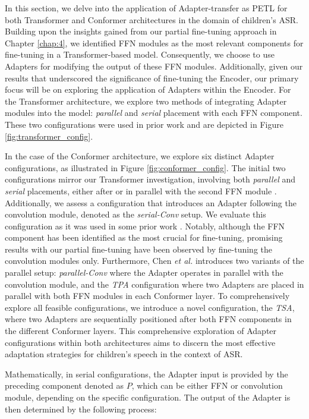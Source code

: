 In this section, we delve into the application of Adapter-transfer as \ac{PETL} for both Transformer and Conformer architectures in the domain of children's \ac{ASR}. Building upon the insights gained from our partial fine-tuning approach in Chapter \ref{chap:4}, we identified \ac{FFN} modules as the most relevant components for fine-tuning in a Transformer-based model. Consequently, we choose to use Adapters for modifying the output of these \ac{FFN} modules. Additionally, given our results that underscored the significance of fine-tuning the Encoder, our primary focus will be on exploring the application of Adapters within the Encoder. For the Transformer architecture, we explore two methods of integrating Adapter modules into the model: \textit{parallel} and \textit{serial} placement with each \ac{FFN} component. These two configurations were used in prior work \cite{he2022towards} and are depicted in Figure \ref{fig:transformer_config}.

In the case of the Conformer architecture, we explore six distinct Adapter configurations, as illustrated in Figure \ref{fig:conformer_config}. The initial two configurations mirror our Transformer investigation, involving both \textit{parallel} and \textit{serial} placements, either after or in parallel with the second \ac{FFN} module \cite{chen2023efficient}. Additionally, we assess a configuration that introduces an Adapter following the convolution module, denoted as the \textit{serial-Conv} setup. We evaluate this configuration as it was used in some prior work \cite{10095837}. Notably, although the \ac{FFN} component has been identified as the most crucial for fine-tuning, promising results with our partial fine-tuning have been observed by fine-tuning the convolution modules only. Furthermore, Chen \textit{et al.} \cite{chen2023efficient} introduces two variants of the parallel setup: \textit{parallel-Conv} where the Adapter operates in parallel with the convolution module, and the \textit{\ac{TPA}} configuration where two Adapters are placed in parallel with both \ac{FFN} modules in each Conformer layer. 
To comprehensively explore all feasible configurations, we introduce a novel configuration, the \textit{\ac{TSA}}, where two Adapters are sequentially positioned after both \ac{FFN} components in the different Conformer layers. 
This comprehensive exploration of Adapter configurations within both architectures aims to discern the most effective adaptation strategies for children's speech in the context of \ac{ASR}. 


Mathematically, in serial configurations, the Adapter input is provided by the preceding component denoted as $P$, which can be either \ac{FFN} or convolution module, depending on the specific configuration. The output of the Adapter is then determined by the following process:

